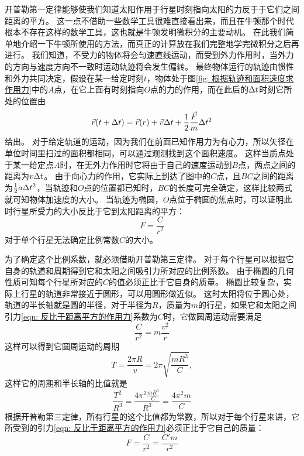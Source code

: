 开普勒第一定律能够使我们知道太阳作用于行星时刻指向太阳的力反于于它们之间距离的平方。
这一点不借助一些数学工具很难直接看出来，而且在牛顿那个时代根本不存在这样的数学工具，这也就是牛顿发明微积分的主要动机。
在此我们简单地介绍一下牛顿所使用的方法，而真正的计算放在我们完整地学完微积分之后再进行。
我们知道，不受力的物体将会匀速直线运动，而受到外力作用时，当外力的方向与速度方向不一致时运动轨迹将会发生偏转。
最终物体运行的轨迹由惯性和外力共同决定，假设在某一给定时刻$t$，物体处于图\ref{fig: 根据轨迹和面积速度求作用力}中的$A$点，在它上面有时刻指向$O$点的力的作用，而在此后的$\Delta t$时刻它所处的位置由
\begin{equation}
\vec{r}(t+\Delta t)=\vec{r}(r)+\vec{v}\Delta t+\frac{1}{2}\frac{\vec{F}}{m}\Delta t^2
\end{equation}
给出。
对于给定轨道的运动，因为我们在前面已知作用力为有心力，所以矢径在单位时间里扫过的面积都相同，可以通过观测找到这个面积速度。
这样当质点处于某一给定点$A$时，在无外力作用时它将由于自己的速度运动到$B$点，两点之间的距离为$v\Delta t$。
由于向心力的作用，它实际上到达了图中的$C$点，且$BC$之间的距离为$\frac{1}{2}a\Delta t^2$，当轨迹和$O$点的位置都已知时，$BC$的长度可完全确定，这样比较两式就可知物体加速度的大小。
当轨迹为椭圆，$O$点位于椭圆的焦点时，可以证明此时行星所受力的大小反比于它到太阳距离的平方：
\begin{equation}\label{eqn: 反比于距离平方的作用力}
F = \frac{C}{r^2}
\end{equation}
对于单个行星无法确定比例常数$C$的大小。

为了确定这个比例系数，就必须借助开普勒第三定律。
对于每个行星可以根据它自身的轨道和周期得到它和太阳之间吸引力所对应的比例系数。
由于椭圆的几何性质可知每个行星所对应的$C$的值必须正比于它自身的质量。
椭圆比较复杂，实际上行星的轨道非常接近于圆形，可以用圆形做近似。
这时太阳将位于圆心处，轨道的半长轴就是圆的半径，对于半径为$R$，质量为$m$的行星，如果它和太阳之间引力\ref{eqn: 反比于距离平方的作用力}系数为$C$时，它做圆周运动需要满足
\begin{equation}
\frac{C}{r^2}=m\frac{v^2}{r}
\end{equation}
这样可以得到它圆周运动的周期
\begin{equation}
T=\frac{2\pi R}{v}=2\pi\sqrt{\frac{mR^3}{C}},
\end{equation}
这样它的周期和半长轴的比值就是
\begin{equation}
\frac{T^2}{R^3} = \frac{4\pi^2\frac{mR^3}{C}}{R^3}=\frac{4\pi^2m}{C}
\end{equation}
根据开普勒第三定律，所有行星的这个比值都为常数，所以对于每个行星来讲，它所受到的引力\ref{eqn: 反比于距离平方的作用力}必须正比于它自己的质量：
\begin{equation}
F = \frac{C}{r^2}=\frac{C'm}{r^2}
\end{equation}

